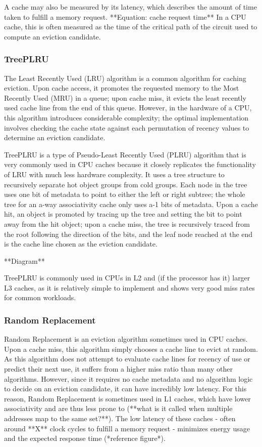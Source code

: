 A cache may also be measured by its latency, which describes the amount of time taken to fulfill a memory request.
**Equation: cache request time**
In a CPU cache, this is often measured as the time of the critical path of the circuit used to compute an eviction candidate.

\subsubsection{TreePLRU}

The Least Recently Used (LRU) algorithm is a common algorithm for caching eviction.
Upon cache access, it promotes the requested memory to the Most Recently Used (MRU) in a queue;
upon cache miss, it evicts the least recently used cache line from the end of this queue.
However, in the hardware of a CPU, this algorithm introduces considerable complexity;
the optimal implementation involves checking the cache state against each permutation of recency values to determine an eviction candidate.

TreePLRU is a type of Pseudo-Least Recently Used (PLRU) algorithm that is very commonly used in CPU caches
because it closely replicates the functionality of LRU with much less hardware complexity.
It uses a tree structure to recursively separate hot object groups from cold groups.
Each node in the tree uses one bit of metadata to point to either the left or right subtree; the whole tree for an a-way associativity cache
only uses a-1 bits of metadata.
Upon a cache hit, an object is promoted by tracing up the tree and setting the bit to point away from the hit object;
upon a cache miss, the tree is recursively traced from the root following the direction of the bits, and the
leaf node reached at the end is the cache line chosen as the eviction candidate.

**Diagram**

TreePLRU is commonly used in CPUs in L2 and (if the processor has it) larger L3 caches, as it is relatively simple to implement 
and shows very good miss rates for common workloads.

\subsubsection{Random Replacement}
Random Replacement is an eviction algorithm sometimes used in CPU caches.
Upon a cache miss, this algorithm simply chooses a cache line to evict at random.
As this algorithm does not attempt to evaluate cache lines for recency of use or predict their next use,
it suffers from a higher miss ratio than many other algorithms.
However, since it requires no cache metadata and no algorithm logic to decide on an eviction candidate,
it can have incredibly low latency.
For this reason, Random Replacement is sometimes used in L1 caches, which have lower associativity
and are thus less prone to (**what is it called when multiple addresses map to the same set?**).
The low latency of these caches - often around **X** clock cycles to fulfill a memory request -
minimizes energy usage and the expected response time (*reference figure*).

